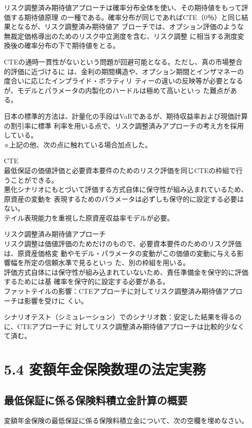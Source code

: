 \documentclass[report,gutter=10mm,fore-edge=10mm,uplatex,dvipdfmx]{jlreq}
\begin{document}
{リスク調整済み期待値アプローチは確率分布全体を使い、その期待値をもって評価する期待値原理
の一種である。確率分布が同じであればCTE（0％）と同じ結果となるが、リスク調整済み期待値ア
ブローチでは、オプション評価のような無裁定価格導出のためのリスク中立測度を含む、リスク調整
に相当する測度変換後の確率分布の下で期待値をとる。

CTEの通時一貫性がないという問題が回避可能となる。ただし、真の市場整合的評価に近づけるに
は、金利の期間構造や、オプション期間とインザマネーの度合いに応じたインプライド・ボラティリ
ティーの違いの反映等が必要となるが、モデルとパラメータの内製化のハードルは極めて高いといっ
た難点がある。

日本の標準的方法は、計量化の手段はVaRであるが、期待収益率および現価計算の割引率に標準
利率を用いる点で、リスク調整済みアプローチの考え方を採用している。\\
※上記の他、次の点に触れている場合加点した。\vspace{1zh}

CTE\\
最低保証の価値評価と必要資本要件のためのリスク評価を同じCTEの枠組で行うことができる。\\
悪化シナリオにもとづいて評価する方式自体に保守性が組み込まれているため、原資産の変動を
表現するためのパラメータは必ずしも保守的に設定する必要はない。\\
テイル表現能力を重視した原資産収益率モデルが必要。

リスク調整済み期待値アプローチ\\
リスク調整は価値評価のためだけのもので、必要資本要件のためのリスク評価は、原資産価格変
動やモデル・パラメータの変動がこの価値の変動に与える影響幅を所定の信頼水準で見るといっ
た、別の枠組を用いる。\\
評価方式自体には保守性が組み込まれていないため、責任準備金を保守的に評価するためには基
確率を保守的に設定する必要がある。\\

ファットテイルの影響：CTEアプローチに対してリスク調整済み期待値アプローチは影響を受けに
くい。

シナリオテスト（シミュレーション）でのシナリオ数：安定した結果を得るのに、CTEアプローチに
対してリスク調整済み期待値アプローチは比較的少なくて済む。
\section{5.4 変額年金保険数理の法定実務}
\subsection{最低保証に係る保険料積立金計算の概要}
変額年金保険の最低保証に係る保険料積立金について、次の空欄を埋めなさい。

}
\end{document}
